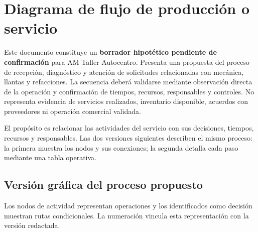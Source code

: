 \documentclass[12pt,letterpaper,oneside]{article}
\begin{document}
\section{Diagrama de flujo de producción o servicio}

Este documento constituye un \textbf{borrador hipotético pendiente de confirmación} para AM Taller Autocentro. Presenta una propuesta del proceso de recepción, diagnóstico y atención de solicitudes relacionadas con mecánica, llantas y refacciones. La secuencia deberá validarse mediante observación directa de la operación y confirmación de tiempos, recursos, responsables y controles. No representa evidencia de servicios realizados, inventario disponible, acuerdos con proveedores ni operación comercial validada.

El propósito es relacionar las actividades del servicio con sus decisiones, tiempos, recursos y responsables. Las dos versiones siguientes describen el mismo proceso: la primera muestra los nodos y sus conexiones; la segunda detalla cada paso mediante una tabla operativa.

\subsection{Versión gráfica del proceso propuesto}

Los nodos de actividad representan operaciones y los identificados como decisión muestran rutas condicionales. La numeración vincula esta representación con la versión redactada.
\end{document}
